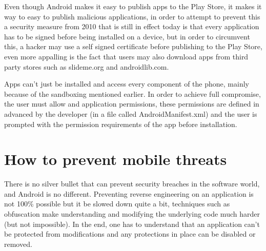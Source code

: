 Even though Android makes it easy to publish apps to the Play Store, it makes it way to easy to publish malicious applications, in order to attempt to prevent this a security measure from 2010 that is still in effect today is that every application has to be signed before being installed on a device, but in order to circumvent this, a hacker may use a self signed certificate before publishing to the Play Store, even more appalling is the fact that users may also download apps from third party stores such as slideme.org and androidlib.com.

Apps can't just be installed and access every component of the phone, mainly because of the sandboxing mentioned earlier. In order to achieve full compromise, the user must allow and application permissions, these permissions are defined in advanced by the developer (in a file called AndroidManifest.xml) and the user is prompted with the permission requirements of the app before installation.



\section{How to prevent mobile threats}
There is no silver bullet that can prevent security breaches in the software world, and Android is no different. Preventing reverse engineering on an application is not 100\% possible but it be slowed down quite a bit, techniques such as obfuscation make understanding and modifying the underlying code much harder (but not impossible). In the end, one has to understand that an application can't be protected from modifications and any protections in place can be disabled or removed.

